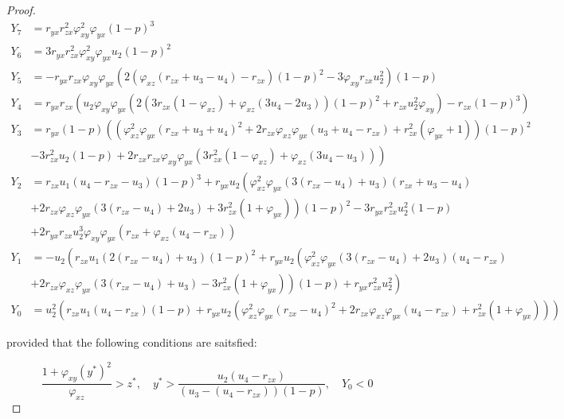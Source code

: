 \begin{proof}
    \begin{align*}
        Y_7 &= r_{yx}r_{zx}^2\varphi_{xy}^2\varphi_{yx}\left(1-p\right)^3\\
        Y_6 &= 3r_{yx}r_{zx}^2\varphi_{xy}^2\varphi_{yx}u_2\left(1-p\right)^2\\
        Y_5 &= -r_{yx}r_{zx}\varphi_{xy}\varphi_{yx}\left(2\left(\varphi_{xz}\left(r_{zx}+u_3-u_4\right)-r_{zx}\right)\left(1-p\right)^2-3\varphi_{xy}r_{zx}u_2^2\right)\left(1-p\right)\\
        Y_4 &= r_{yx}r_{zx}\left(u_2\varphi_{xy}\varphi_{yx}\left(2\left(3r_{zx}\left(1-\varphi_{xz}\right)+\varphi_{xz}\left(3u_4-2u_3\right)\right)\left(1-p\right)^2+r_{zx}u_2^2\varphi_{xy}\right)-r_{zx}\left(1-p\right)^3\right)\\
        Y_3 &= r_{yx}\left(1-p\right)\left(\left(\varphi_{xz}^2\varphi_{yx}\left(r_{zx}+u_3+u_4\right)^2+2r_{zx}\varphi_{xz}\varphi_{yx}\left(u_3+u_4-r_{zx}\right)+r_{zx}^2\left(\varphi_{yx}+1\right)\right)\left(1-p\right)^2\right.\\
        &\left.-3r_{zx}^2u_2\left(1-p\right)+2r_{zx}r_{zx}\varphi_{xy}\varphi_{yx}\left(3r_{zx}^2\left(1-\varphi_{xz}\right)+\varphi_{xz}\left(3u_4-u_3\right)\right)\right)\\
        Y_2 &= r_{zx}u_1\left(u_4-r_{zx}-u_3\right)\left(1-p\right)^3+r_{yx}u_2\left(\varphi_{xz}^2\varphi_{yx}\left(3\left(r_{zx}-u_4\right)+u_3\right)\left(r_{zx}+u_3-u_4\right)\right.\\
        &\left.+2r_{zx}\varphi_{xz}\varphi_{yx}\left(3\left(r_{zx}-u_4\right)+2u_3\right)+3r_{zx}^2\left(1+\varphi_{yx}\right)\right)\left(1-p\right)^2-3r_{yx}r_{zx}^2u_2^2\left(1-p\right)\\
        &+2r_{yx}r_{zx}u_2^3\varphi_{xy}\varphi_{yx}\left(r_{zx}+\varphi_{xz}\left(u_4-r_{zx}\right)\right)\\
        Y_1 &= -u_2\left(r_{zx}u_1\left(2\left(r_{zx}-u_4\right)+u_3\right)\left(1-p\right)^2+r_{yx}u_2\left(\varphi_{xz}^2\varphi_{yx}\left(3\left(r_{zx}-u_4\right)+2u_3\right)\left(u_4-r_{zx}\right)\right.\right.\\
        &\left.\left.+2r_{zx}\varphi_{xz}\varphi_{yx}\left(3\left(r_{zx}-u_4\right)+u_3\right)-3r_{zx}^2\left(1+\varphi_{yx}\right)\right)\left(1-p\right)+r_{yx}r_{zx}^2u_2^2\right)\\
        Y_0 &= u_2^2\left(r_{zx}u_1\left(u_4-r_{zx}\right)\left(1-p\right)+r_{yx}u_2\left(\varphi_{xz}^2\varphi_{yx}\left(r_{zx}-u_4\right)^2+2r_{zx}\varphi_{xz}\varphi_{yx}\left(u_4-r_{zx}\right)+r_{zx}^2\left(1+\varphi_{yx}\right)\right)\right)
    \end{align*}

    provided that the following conditions are saitsfied:
    
    \begin{equation*}
        \frac{1+\varphi_{xy}\left(y^*\right)^2}{\varphi_{xz}}>z^*,\quad y^*>\frac{u_2\left(u_4-r_{zx}\right)}{\left(u_3-\left(u_4-r_{zx}\right)\right)\left(1-p\right)},\quad Y_0<0
    \end{equation*}
\end{proof}

